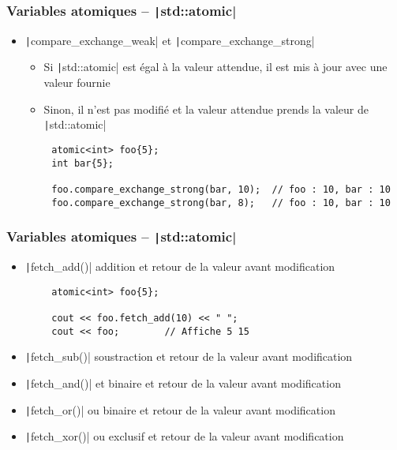 \documentclass[C++.tex]{subfiles}
\begin{document}
\begin{frame}[fragile]
	\frametitle{Variables atomiques -- \texttt|std::atomic|}
	\begin{itemize}
		\item \texttt|compare_exchange_weak| et \texttt|compare_exchange_strong| 


		\begin{itemize}
			\item Si \texttt|std::atomic| est égal à la valeur attendue, il est mis à jour avec une valeur fournie
			\item Sinon, il n'est pas modifié et la valeur attendue prends la valeur de \texttt|std::atomic|
		\end{itemize}
	\end{itemize}

	\begin{verbatim}
		atomic<int> foo{5};
		int bar{5};

		foo.compare_exchange_strong(bar, 10);  // foo : 10, bar : 10
		foo.compare_exchange_strong(bar, 8);   // foo : 10, bar : 10
	\end{verbatim}
\end{frame}

\begin{frame}[fragile]
	\frametitle{Variables atomiques -- \texttt|std::atomic|}
	\begin{itemize}
		\item \texttt|fetch_add()| addition et retour de la valeur avant modification
	\end{itemize}

	\begin{verbatim}
		atomic<int> foo{5};

		cout << foo.fetch_add(10) << " ";
		cout << foo;        // Affiche 5 15
	\end{verbatim}

	\begin{itemize}
		\item \texttt|fetch_sub()| soustraction et retour de la valeur avant modification
		\item \texttt|fetch_and()| et binaire et retour de la valeur avant modification
		\item \texttt|fetch_or()| ou binaire et retour de la valeur avant modification
		\item \texttt|fetch_xor()| ou exclusif et retour de la valeur avant modification
	\end{itemize}
\end{frame}
\end{document}
